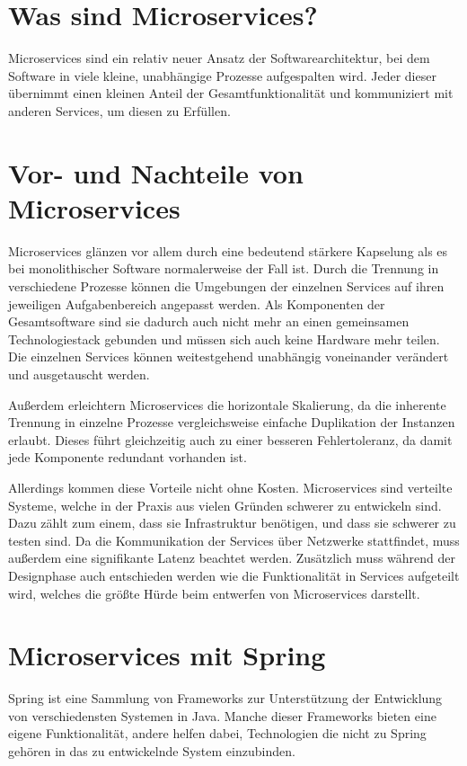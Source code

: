 \documentclass{article}
\begin{document}
\section{Was sind Microservices?}

Microservices sind ein relativ neuer Ansatz der Softwarearchitektur, bei dem Software in viele kleine, unabhängige Prozesse aufgespalten wird\cite{OMA}.
Jeder dieser übernimmt einen kleinen Anteil der Gesamtfunktionalität und kommuniziert mit anderen Services, um diesen zu Erfüllen\cite{EMMA}.

\section{Vor- und Nachteile von Microservices}

Microservices glänzen vor allem durch eine bedeutend stärkere Kapselung als es bei monolithischer Software normalerweise der Fall ist.
Durch die Trennung in verschiedene Prozesse können die Umgebungen der einzelnen Services auf ihren jeweiligen Aufgabenbereich angepasst werden.
Als Komponenten der Gesamtsoftware sind sie dadurch auch nicht mehr an einen gemeinsamen Technologiestack gebunden und müssen sich auch keine Hardware mehr teilen.
Die einzelnen Services können weitestgehend unabhängig voneinander verändert und ausgetauscht werden.

Außerdem erleichtern Microservices die horizontale Skalierung, da die inherente Trennung in einzelne Prozesse vergleichsweise einfache Duplikation der Instanzen erlaubt.
 Dieses führt gleichzeitig auch zu einer besseren Fehlertoleranz, da damit jede Komponente redundant vorhanden ist.

Allerdings kommen diese Vorteile nicht ohne Kosten.
 Microservices sind verteilte Systeme, welche in der Praxis aus vielen Gründen schwerer zu entwickeln sind.
 Dazu zählt zum einem, dass sie Infrastruktur benötigen, und dass sie schwerer zu testen sind.
 Da die Kommunikation der Services über Netzwerke stattfindet, muss außerdem eine signifikante Latenz beachtet werden.
 Zusätzlich muss während der Designphase auch entschieden werden wie die Funktionalität in Services aufgeteilt wird, welches die größte Hürde beim entwerfen von Microservices darstellt.\cite{OMA}

\section{Microservices mit Spring}

Spring ist eine Sammlung von Frameworks zur Unterstützung der Entwicklung von verschiedensten Systemen in Java.
Manche dieser Frameworks bieten eine eigene Funktionalität, andere helfen dabei, Technologien die nicht zu Spring gehören in das zu entwickelnde System einzubinden.
\end{document}
